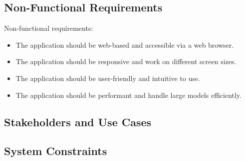   \subsection{Non-Functional Requirements}
  \label{subsec:non-functional-requirements}

  Non-functional requirements:

  \begin{itemize}
    \item The application should be web-based and accessible via a web browser.
    \item The application should be responsive and work on different screen sizes.
    \item The application should be user-friendly and intuitive to use.
    \item The application should be performant and handle large models efficiently.
\end{itemize}


  \subsection{Stakeholders and Use Cases}
  \label{subsec:stakeholders}

  \subsection{System Constraints}
  \label{subsec:system-constraints}